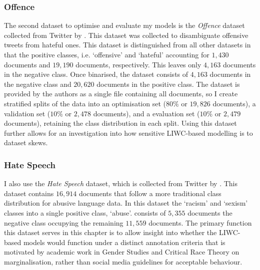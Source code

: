 \subsubsection{Offence}
The second dataset  to optimise and evaluate my models is the \textit{Offence} dataset collected from Twitter by \citet{Davidson:2017}.
This dataset was collected to disambiguate offensive tweets from hateful ones.
This dataset is distinguished from all other datasets in that the positive classes, i.e. `offensive' and `hateful' accounting for $1,430$ documents and $19,190$ documents, respectively.
This leaves only $4,163$ documents in the negative class.
Once binarised, the dataset consists of $4,163$ documents in the negative class and $20,620$ documents in the positive class.
The dataset is provided by the authors as a single file containing all documents, so I create stratified splits of the data into an optimisation set ($80\%$ or $19,826$ documents), a validation set ($10\%$ or $2,478$ documents), and a evaluation set ($10\%$ or $2,479$ documents), retaining the class distribution in each split.
Using this dataset further allows for an investigation into how sensitive LIWC-based modelling is to dataset skews.

\subsubsection{Hate Speech}
I also use the \textit{Hate Speech} dataset, which is collected from Twitter by \citet{Waseem-Hovy:2016}.
This dataset contains $16,914$ documents that follow a more traditional class distribution for abusive language data.
In this dataset  the  `racism' and `sexism' classes into a single positive class, `abuse'. 
 consists of $5,355$ documents  the negative class occupying the remaining $11,559$ documents.
The primary function  this dataset serves in this chapter is to allow  insight into whether the LIWC-based models would function under a distinct annotation criteria that is motivated by academic work in Gender Studies and Critical Race Theory on marginalisation, rather than social media guidelines for acceptable behaviour.


